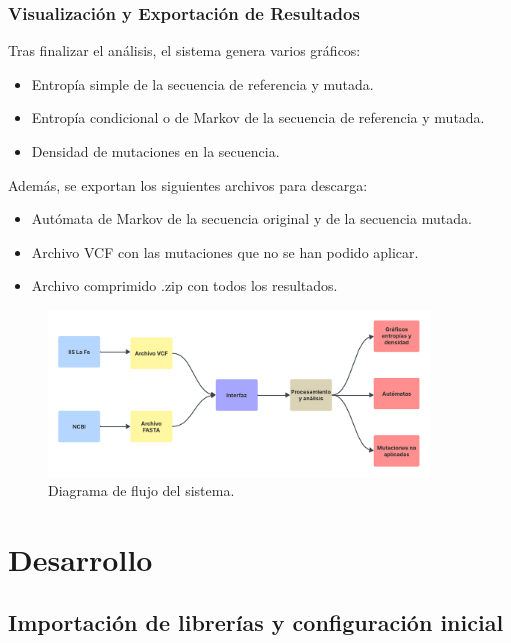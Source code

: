 \documentclass[11pt,spanish,listoffigures,listoftables]{tfgetsinf}
\begin{document}
\subsection{Visualización y Exportación de Resultados }

Tras finalizar el análisis, el sistema genera varios gráficos: 

\begin{itemize}
   \item Entropía simple de la secuencia de referencia y mutada. 
   \item Entropía condicional o de Markov de la secuencia de referencia y mutada. 
   \item Densidad de mutaciones en la secuencia. 
\end{itemize}

Además, se exportan los siguientes archivos para descarga: 
   \begin{itemize}
   \item Autómata de Markov de la secuencia original y de la secuencia mutada. 
   \item Archivo \ac{VCF} con las mutaciones que no se han podido aplicar. 
   \item Archivo comprimido .zip con todos los resultados. 
\end{itemize}

\begin{figure}[H]
      \centering
      \includegraphics[width=0.9\textwidth]{Diagramas de flujo.png}
      \caption{Diagrama de flujo del sistema.}
      \label{fig:etiqueta_opcional5}
   \end{figure}



\chapter{Desarrollo}

\section{Importación de librerías y configuración inicial }
\end{document}
